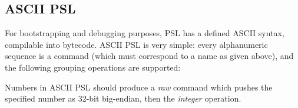 \subsection{ASCII PSL}

For bootstrapping and debugging purposes, PSL has a defined ASCII syntax, compilable into bytecode. ASCII PSL is very simple: every alphanumeric sequence is a command (which must correspond to a name as given above), and the following grouping operations are supported:


Numbers in ASCII PSL should produce a \textit{raw} command which pushes the specified number as 32-bit big-endian, then the \textit{integer} operation.
